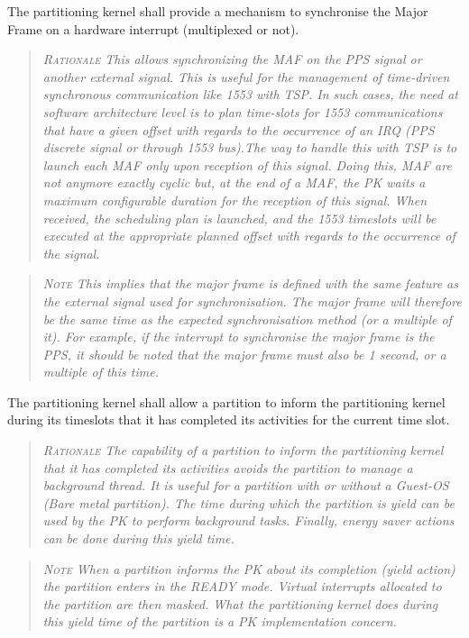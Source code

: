 The partitioning kernel shall provide a mechanism to synchronise the Major Frame on a hardware interrupt (multiplexed or not).
\begin{quote}\it
\textsc{Rationale}
This allows synchronizing the MAF on the PPS signal or another external signal. This is useful for the management of time-driven synchronous communication like 1553 with TSP. In such cases, the need at software architecture level is to plan time-slots for 1553 communications that have a given offset with regards to the occurrence of an IRQ (PPS discrete signal or through 1553 bus).The way to handle this with TSP is to launch each MAF only upon reception of this signal. Doing this, MAF are not anymore exactly cyclic but, at the end of a MAF, the PK waits a maximum configurable duration for the reception of this signal. When received, the scheduling plan is launched, and the 1553 timeslots will be executed at the appropriate planned offset with regards to the occurrence of the signal.
\end{quote}
\begin{quote}\it
\textsc{Note}
This implies that the major frame is defined with the same feature as the external signal used for synchronisation.  The major frame will therefore be the same time as the expected synchronisation method (or a multiple of it). For example, if the interrupt to synchronise the major frame is the PPS, it should be noted that the major frame must also be 1 second, or a multiple of this time.
\end{quote}

The partitioning kernel shall allow a partition to inform the partitioning kernel during its timeslots that it has completed its activities for the current time slot.
\begin{quote}\it
\textsc{Rationale}
The capability of a partition to inform the partitioning kernel that it has completed its activities avoids the partition to manage a background thread. It is useful for a partition with or without a Guest-OS (Bare metal partition). The time during which the partition is yield can be used by the PK to perform background tasks. Finally, energy saver actions can be done during this yield time.
\end{quote}
\begin{quote}\it
\textsc{Note}
When a partition informs the PK about its completion (yield action) the partition enters in the READY mode. Virtual interrupts allocated to the partition are then masked. What the partitioning kernel does during this yield time of the partition is a PK implementation concern.
\end{quote}

